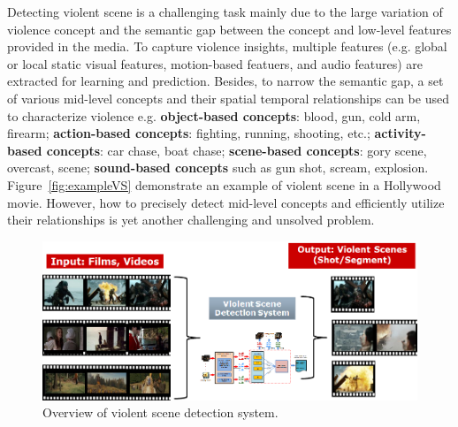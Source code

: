 \documentclass[twocolumn]{bmcart}%
\begin{document}
Detecting violent scene is a challenging task mainly due to the large variation of violence concept and the semantic gap between the concept and low-level features provided in the media. To capture violence insights, multiple features (e.g. global or local static visual features, motion-based featuers, and audio features) are extracted for learning and prediction. Besides, to narrow the semantic gap, a set of various mid-level concepts and their spatial temporal relationships can be used to characterize violence e.g. {\bf object-based concepts}: blood,  gun, cold arm, firearm; {\bf action-based concepts}: fighting, running, shooting, etc.; {\bf activity-based concepts}: car chase, boat chase; {\bf scene-based concepts}: gory scene, overcast, scene; {\bf sound-based concepts} such as gun shot, scream, explosion. Figure~\ref{fig:exampleVS} demonstrate an example of violent scene in a Hollywood movie. However, how to precisely detect mid-level concepts and efficiently utilize their relationships is yet another challenging and unsolved problem.
\begin{figure}[!t]
	\centering
	\includegraphics[width=2\linewidth]{Images/SystemOverview.png}
	\caption{Overview of violent scene detection system.}
	\label{fig:systemoverview}
\end{figure}
\end{document}
